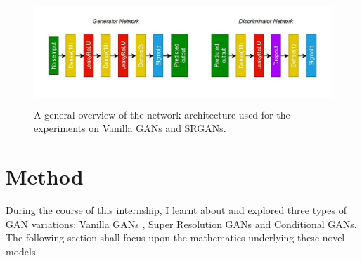 \documentclass[10pt,journal,compsoc]{IEEEtran}
\begin{document}
\begin{figure}
    \centering
    \includegraphics[scale = 1.5, height = 4cm, width = 14cm]{gans600}
    \caption{A general overview of the network architecture used for the experiments on Vanilla GANs and SRGANs.}
    \label{fig:gansfig}
\end{figure}

\section{Method}

During the course of this internship, I learnt about and explored three types of GAN variations: Vanilla GANs , Super Resolution GANs and Conditional GANs. The following
section shall focus upon the mathematics underlying these novel models.
\end{document}
